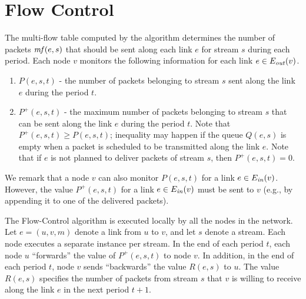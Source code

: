 \documentclass[12pt]{article}
\newenvironment{proof sketch}[1]{\noindent {\emph{Proof sketch of #1:}}}{\hfill \qed}
\newcommand{\mf}{\text{\emph{mf}}}
\newcommand{\Ein}{E_{\text{\emph{in}}}}
\newcommand{\Eout}{E_{\text{\emph{out}}}}
\begin{document}
\section{Flow Control}\label{sec:flow control}
The multi-flow table computed by the algorithm determines the number of packets $\mf(e,s)$
that should be sent along each link $e$ for stream $s$ during each period.
Each node $v$ monitors the following information for each link $e \in \Eout (v)$.
\begin{enumerate}
\item $P(e,s,t)$ - the number of packets belonging to stream $s$ sent
  along the link $e$ during the period $t$.
\item $P^+(e,s,t)$ - the maximum number of packets belonging to stream
  $s$ that can be sent along the link $e$ during the period $t$. Note
  that $P^+(e,s,t)\geq P(e,s,t)$; inequality may happen if the queue
  $Q(e,s)$ is empty when a packet is scheduled to be transmitted along
  the link $e$. Note that if $e$ is not planned to deliver packets of
  stream $s$, then $P^+(e,s,t)=0$.
\end{enumerate}
We remark that a node $v$ can also monitor $P(e,s,t)$ for a link $e\in
\Ein(v)$.  However, the value $P^+(e,s,t)$ for a link $e\in \Ein(v)$
must be sent to $v$ (e.g., by appending it to one of the delivered
packets).

The Flow-Control algorithm is executed locally by all the nodes in the
network. Let $e=(u,v,m)$ denote a link from $u$ to $v$, and let $s$
denote a stream. Each node executes a separate instance per stream.
In the end of each period $t$, each node $u$ ``forwards'' the value of
$P^+(e,s,t)$ to node $v$.  In addition, in the end of each period $t$,
node $v$ sends ``backwards'' the value $R(e,s)$ to $u$. The value
$R(e,s)$ specifies the number of packets from stream $s$ that $v$ is
willing to receive along the link $e$ in the next period
$t+1$.
\end{document}
